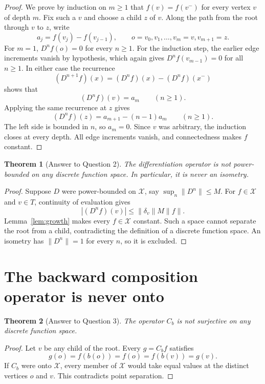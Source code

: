 \documentclass[11pt]{article}
\newtheorem{theorem}{Theorem}
\newcommand{\X}{\mathcal X}
\newcommand{\Cb}{C_b}
\begin{document}
\begin{proof}
We prove by induction on $m\ge1$ that $f(v)=f(v^-)$ for every vertex $v$ of
depth $m$. Fix such a $v$ and choose a child $z$ of $v$. Along the path from
the root through $v$ to $z$, write
\[
  a_j=f(v_j)-f(v_{j-1}),
  \qquad o=v_0,v_1,\ldots,v_m=v,v_{m+1}=z.
\]
For $m=1$, $D^nf(o)=0$ for every $n\ge1$. For the induction step, the earlier
edge increments vanish by hypothesis, which again gives
$D^nf(v_{m-1})=0$ for all $n\ge1$. In either case the recurrence
\[
  (D^{n+1}f)(x)=(D^nf)(x)-(D^nf)(x^-)
\]
shows that
\[
  (D^nf)(v)=a_m\qquad(n\ge1).
\]
Applying the same recurrence at $z$ gives
\[
  (D^nf)(z)=a_{m+1}-(n-1)a_m\qquad(n\ge1).
\]
The left side is bounded in $n$, so $a_m=0$. Since $v$ was arbitrary, the
induction closes at every depth. All edge increments vanish, and connectedness
makes $f$ constant.
\end{proof}

\begin{theorem}[Answer to Question 2]\label{thm:power}
The differentiation operator is not power-bounded on any discrete function
space. In particular, it is never an isometry.
\end{theorem}

\begin{proof}
Suppose $D$ were power-bounded on $\X$, say
$\sup_n\|D^n\|\le M$. For $f\in\X$ and $v\in T$, continuity of evaluation
gives
\[
  |(D^nf)(v)|\le \|\delta_v\|M\|f\|.
\]
Lemma~\ref{lem:growth} makes every $f\in\X$ constant. Such a space cannot
separate the root from a child, contradicting the definition of a discrete
function space. An isometry has $\|D^n\|=1$ for every $n$, so it is excluded.
\end{proof}

\section{The backward composition operator is never onto}

\begin{theorem}[Answer to Question 3]\label{thm:onto}
The operator $\Cb$ is not surjective on any discrete function space.
\end{theorem}

\begin{proof}
Let $v$ be any child of the root. Every $g=\Cb f$ satisfies
\[
  g(o)=f(b(o))=f(o)=f(b(v))=g(v).
\]
If $\Cb$ were onto $\X$, every member of $\X$ would take equal values at the
distinct vertices $o$ and $v$. This contradicts point separation.
\end{proof}
\end{document}
